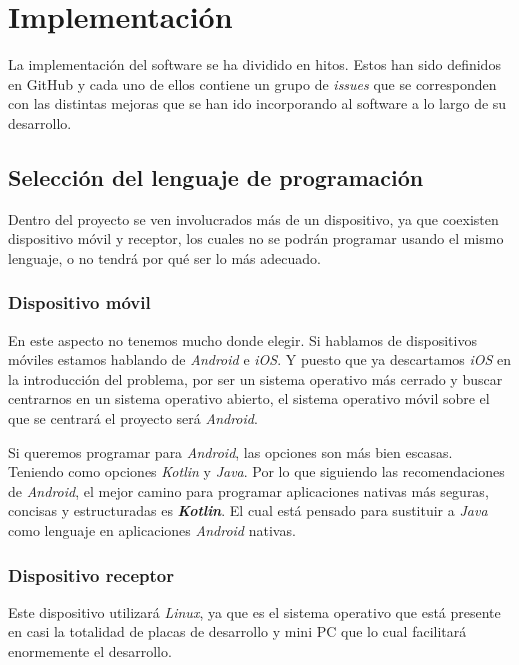 \chapter{Implementación}

La implementación del software se ha dividido en hitos. Estos han sido definidos en GitHub
y cada uno de ellos contiene un grupo de \textit{issues} que se corresponden con las distintas
mejoras que se han ido incorporando al software a lo largo de su desarrollo.\\

\section{Selección del lenguaje de programación}

Dentro del proyecto se ven involucrados más de un dispositivo, ya que coexisten
dispositivo móvil y receptor, los cuales no se podrán programar usando el mismo
lenguaje, o no tendrá por qué ser lo más adecuado.

\subsection{Dispositivo móvil}

En este aspecto no tenemos mucho donde elegir. Si hablamos de dispositivos
móviles estamos hablando de \emph{Android} e \emph{iOS}. Y puesto que ya
descartamos \emph{iOS} en la introducción del problema, por ser un sistema
operativo más cerrado y buscar centrarnos en un sistema operativo abierto, el
sistema operativo móvil sobre el que se centrará el proyecto será \emph{Android}.

Si queremos programar para \emph{Android}, las opciones son más bien escasas.
Teniendo como opciones \emph{Kotlin} y \emph{Java}. Por lo que siguiendo las
recomendaciones de \emph{Android}, el mejor camino para programar aplicaciones
nativas más seguras, concisas y estructuradas es \textbf{\emph{Kotlin}}. El cual está
pensado para sustituir a \emph{Java} como lenguaje en aplicaciones
\emph{Android} nativas.

\subsection{Dispositivo receptor}

Este dispositivo utilizará \emph{Linux}, ya que es el sistema operativo que está
presente en casi la totalidad de placas de desarrollo y mini PC que lo cual
facilitará enormemente el desarrollo. 

